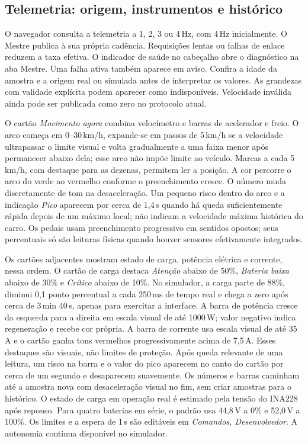 \subsection{Telemetria: origem, instrumentos e histórico}
O navegador consulta a telemetria a 1, 2, 3 ou 4\,Hz, com 4\,Hz inicialmente. O Mestre publica à sua própria cadência. Requisições lentas ou falhas de enlace reduzem a taxa efetiva. O indicador de saúde no cabeçalho abre o diagnóstico na aba Mestre. Uma falha ativa também aparece em aviso. Confira a idade da amostra e a origem real ou simulada antes de interpretar os valores. As grandezas com validade explícita podem aparecer como indisponíveis. Velocidade inválida ainda pode ser publicada como zero no protocolo atual.

O cartão \emph{Movimento agora} combina velocímetro e barras de acelerador e freio. O arco começa em 0--30\,km/h, expande-se em passos de 5\,km/h se a velocidade ultrapassar o limite visual e volta gradualmente a uma faixa menor após permanecer abaixo dela; esse arco não impõe limite ao veículo. Marcas a cada 5\,km/h, com destaque para as dezenas, permitem ler a posição. A cor percorre o arco do verde ao vermelho conforme o preenchimento cresce. O número muda discretamente de tom na desaceleração. Um pequeno risco dentro do arco e a indicação \emph{Pico} aparecem por cerca de 1,4\,s quando há queda suficientemente rápida depois de um máximo local; não indicam a velocidade máxima histórica do carro. Os pedais usam preenchimento progressivo em sentidos opostos; seus percentuais só são leituras físicas quando houver sensores efetivamente integrados.

Os cartões adjacentes mostram estado de carga, potência elétrica e corrente, nessa ordem. O cartão de carga destaca \emph{Atenção} abaixo de 50\%, \emph{Bateria baixa} abaixo de 30\% e \emph{Crítico} abaixo de 10\%. No simulador, a carga parte de 88\%, diminui 0,1 ponto percentual a cada 250\,ms de tempo real e chega a zero após cerca de 3\,min 40\,s, apenas para exercitar a interface. A barra de potência cresce da esquerda para a direita em escala visual de até 1000\,W; valor negativo indica regeneração e recebe cor própria. A barra de corrente usa escala visual de até 35\,A e o cartão ganha tons vermelhos progressivamente acima de 7,5\,A. Esses destaques são visuais, não limites de proteção. Após queda relevante de uma leitura, um risco na barra e o valor do pico aparecem no canto do cartão por cerca de um segundo e desaparecem suavemente. Os números e barras caminham até a amostra nova com desaceleração visual no fim, sem criar amostras para o histórico. O estado de carga em operação real é estimado pela tensão do INA228 após repouso. Para quatro baterias em série, o padrão usa 44,8\,V a 0\% e 52,0\,V a 100\%. Os limites e a espera de 1\,s são editáveis em \emph{Comandos, Desenvolvedor}. A autonomia continua disponível no simulador.

